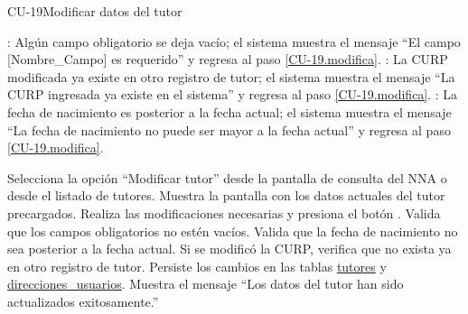 \begin{UseCase}{CU-19}{Modificar datos del tutor}
{\begin{Titemize}
			: Algún campo obligatorio se deja vacío; el sistema muestra el mensaje ``El campo [Nombre\_Campo] es requerido'' y regresa al paso \ref{CU-19.modifica}.
			: La CURP modificada ya existe en otro registro de tutor; el sistema muestra el mensaje ``La CURP ingresada ya existe en el sistema'' y regresa al paso \ref{CU-19.modifica}.
			: La fecha de nacimiento es posterior a la fecha actual; el sistema muestra el mensaje ``La fecha de nacimiento no puede ser mayor a la fecha actual'' y regresa al paso \ref{CU-19.modifica}.
		\end{Titemize}
	}
\end{UseCase}

\begin{UCtrayectoria}
	\UCpaso[\UCactor] Selecciona la opción ``Modificar tutor'' desde la pantalla de consulta del NNA o desde el listado de tutores.
	\UCpaso Muestra la pantalla  con los datos actuales del tutor precargados.
	\UCpaso[\UCactor] \label{CU-19.modifica} Realiza las modificaciones necesarias y presiona el botón .
	\UCpaso Valida que los campos obligatorios no estén vacíos. 
	\UCpaso Valida que la fecha de nacimiento no sea posterior a la fecha actual. 
	\UCpaso Si se modificó la CURP, verifica que no exista ya en otro registro de tutor. 
	\UCpaso Persiste los cambios en las tablas \hyperlink{Tutores}{tutores} y \hyperlink{Direcciones}{direcciones\_usuarios}.
	\UCpaso Muestra el mensaje ``Los datos del tutor han sido actualizados exitosamente.''
\end{UCtrayectoria}


